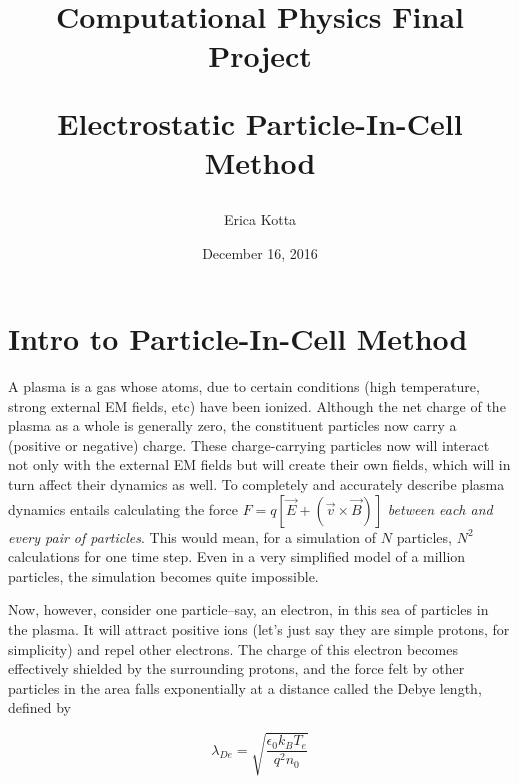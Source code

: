 \documentclass{article}
\title{
 Computational Physics Final Project \\ 
\begin{large} 
  Electrostatic Particle-In-Cell Method
\end{large} }
\author{Erica Kotta }
\date{December 16, 2016}
\begin{document}
\maketitle





\section{Intro to Particle-In-Cell Method}
A plasma is a gas whose atoms, due to certain conditions (high temperature, strong external EM fields, etc) have been ionized. Although the net charge of the plasma as a whole is generally zero, the constituent particles now carry a (positive or negative) charge. These charge-carrying particles now will interact not only with the external EM fields but will create their own fields, which will in turn affect their dynamics as well. 
\newline
To completely and accurately describe plasma dynamics entails calculating the force $F = q\left[\vec{E} + (\vec{v}\times\vec{B})\right]$ \textit{between each and every pair of particles}. This would mean, for a simulation of $N$ particles, $N^2$ calculations for one time step. Even in a very simplified model of a million particles, the simulation becomes quite impossible. 

Now, however, consider one particle--say, an electron, in this sea of particles in the plasma. It will attract positive ions (let's just say they are simple protons, for simplicity) and repel other electrons. The charge of this electron becomes effectively shielded by the surrounding protons, and the force felt by other particles in the area falls exponentially at a distance called the Debye length, defined by 

\begin{equation}
\lambda_{De} = \sqrt{\dfrac{\epsilon_0 k_B T_e}{q^2 n_0}}
\end{equation}
\end{document}
